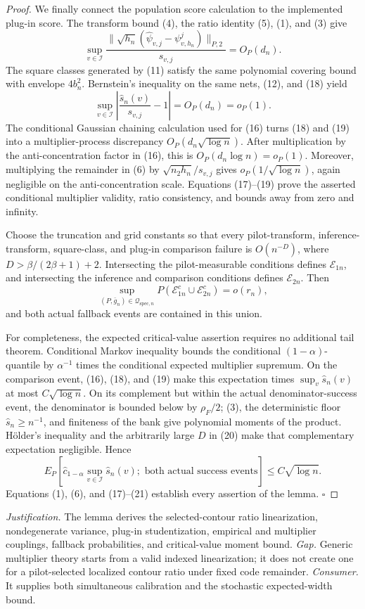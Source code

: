 \documentclass{article}
\begin{document}
\begin{proof}
We finally connect the population score calculation to the implemented plug-in score.  The transform bound (4), the ratio identity (5), (1), and (3) give
\[
 \sup_{v\in\mathcal I}
 \frac{\|\sqrt{h_n}(\widehat\psi_{v,j}-\psi^j_{v,h_n})\|_{P,2}}{s_{v,j}}
 =O_P(d_n). \tag{18}
\]
The square classes generated by (11) satisfy the same polynomial covering bound with envelope \(4b_n^2\).  Bernstein's inequality on the same nets, (12), and (18) yield
\[
 \sup_{v\in\mathcal I}\left|\frac{\widehat s_n(v)}{s_{v,j}}-1\right|=O_P(d_n)=o_P(1). \tag{19}
\]
The conditional Gaussian chaining calculation used for (16) turns (18) and (19) into a multiplier-process discrepancy \(O_P(d_n\sqrt{\log n})\).  After multiplication by the anti-concentration factor in (16), this is \(O_P(d_n\log n)=o_P(1)\).  Moreover, multiplying the remainder in (6) by \(\sqrt{n_2h_n}/s_{v,j}\) gives \(o_P(1/\sqrt{\log n})\), again negligible on the anti-concentration scale.  Equations (17)--(19) prove the asserted conditional multiplier validity, ratio consistency, and bounds away from zero and infinity.

Choose the truncation and grid constants so that every pilot-transform, inference-transform, square-class, and plug-in comparison failure is \(O(n^{-D})\), where \(D>\beta/(2\beta+1)+2\).  Intersecting the pilot-measurable conditions defines \(\mathcal E_{1n}\), and intersecting the inference and comparison conditions defines \(\mathcal E_{2n}\).  Then
\[
 \sup_{(P,\bar g_n)\in\mathcal Q_{\mathrm{spec},n}}
 P(\mathcal E_{1n}^c\cup\mathcal E_{2n}^c)=o(r_n), \tag{20}
\]
and both actual fallback events are contained in this union.

For completeness, the expected critical-value assertion requires no additional tail theorem.  Conditional Markov inequality bounds the conditional \((1-\alpha)\)-quantile by \(\alpha^{-1}\) times the conditional expected multiplier supremum.  On the comparison event, (16), (18), and (19) make this expectation times \(\sup_v\widehat s_n(v)\) at most \(C\sqrt{\log n}\).  On its complement but within the actual denominator-success event, the denominator is bounded below by \(\rho_F/2\); (3), the deterministic floor \(\widehat s_n\ge n^{-1}\), and finiteness of the bank give polynomial moments of the product.  H\"older's inequality and the arbitrarily large \(D\) in (20) make that complementary expectation negligible.  Hence
\[
 E_P\!\left[\widehat c_{1-\alpha}\sup_{v\in\mathcal I}\widehat s_n(v);
 \text{ both actual success events}\right]\le C\sqrt{\log n}. \tag{21}
\]
Equations (1), (6), and (17)--(21) establish every assertion of the lemma. \(\square\)
\end{proof}
\par\smallskip\noindent \textit{Justification.} The lemma derives the selected-contour ratio linearization, nondegenerate variance, plug-in studentization, empirical and multiplier couplings, fallback probabilities, and critical-value moment bound. \textit{Gap.} Generic multiplier theory starts from a valid indexed linearization; it does not create one for a pilot-selected localized contour ratio under fixed code remainder. \textit{Consumer.} It supplies both simultaneous calibration and the stochastic expected-width bound.
\end{document}
